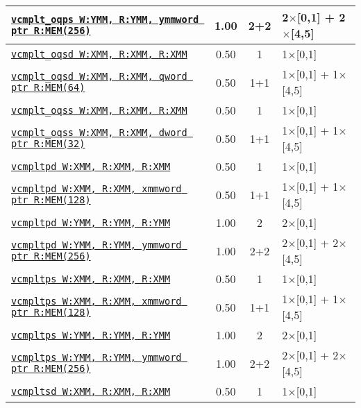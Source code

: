 \documentclass[a4paper,english,fontsize=9]{scrartcl}
\begin{document}
\begin{longtable}{p{}ccL{.25\textwidth}}
  \midrule
  \texttt{\href{https://felixcloutier.com/x86/CMPPS.html}{vcmplt\_oqps W:YMM, R:YMM, ymmword ptr R:MEM(256)}} & 1.00 & 2+2 & 2\(\times\)[0,1] + 2\(\times\)[4,5] \\
  \midrule
  \texttt{\href{https://felixcloutier.com/x86/CMPSD.html}{vcmplt\_oqsd W:XMM, R:XMM, R:XMM}} & 0.50 & 1 & 1\(\times\)[0,1] \\
  \midrule
  \texttt{\href{https://felixcloutier.com/x86/CMPSD.html}{vcmplt\_oqsd W:XMM, R:XMM, qword ptr R:MEM(64)}} & 0.50 & 1+1 & 1\(\times\)[0,1] + 1\(\times\)[4,5] \\
  \midrule
  \texttt{\href{https://felixcloutier.com/x86/CMPSS.html}{vcmplt\_oqss W:XMM, R:XMM, R:XMM}} & 0.50 & 1 & 1\(\times\)[0,1] \\
  \midrule
  \texttt{\href{https://felixcloutier.com/x86/CMPSS.html}{vcmplt\_oqss W:XMM, R:XMM, dword ptr R:MEM(32)}} & 0.50 & 1+1 & 1\(\times\)[0,1] + 1\(\times\)[4,5] \\
  \midrule
  \texttt{\href{https://felixcloutier.com/x86/CMPPD.html}{vcmpltpd W:XMM, R:XMM, R:XMM}} & 0.50 & 1 & 1\(\times\)[0,1] \\
  \midrule
  \texttt{\href{https://felixcloutier.com/x86/CMPPD.html}{vcmpltpd W:XMM, R:XMM, xmmword ptr R:MEM(128)}} & 0.50 & 1+1 & 1\(\times\)[0,1] + 1\(\times\)[4,5] \\
  \midrule
  \texttt{\href{https://felixcloutier.com/x86/CMPPD.html}{vcmpltpd W:YMM, R:YMM, R:YMM}} & 1.00 & 2 & 2\(\times\)[0,1] \\
  \midrule
  \texttt{\href{https://felixcloutier.com/x86/CMPPD.html}{vcmpltpd W:YMM, R:YMM, ymmword ptr R:MEM(256)}} & 1.00 & 2+2 & 2\(\times\)[0,1] + 2\(\times\)[4,5] \\
  \midrule
  \texttt{\href{https://felixcloutier.com/x86/CMPPS.html}{vcmpltps W:XMM, R:XMM, R:XMM}} & 0.50 & 1 & 1\(\times\)[0,1] \\
  \midrule
  \texttt{\href{https://felixcloutier.com/x86/CMPPS.html}{vcmpltps W:XMM, R:XMM, xmmword ptr R:MEM(128)}} & 0.50 & 1+1 & 1\(\times\)[0,1] + 1\(\times\)[4,5] \\
  \midrule
  \texttt{\href{https://felixcloutier.com/x86/CMPPS.html}{vcmpltps W:YMM, R:YMM, R:YMM}} & 1.00 & 2 & 2\(\times\)[0,1] \\
  \midrule
  \texttt{\href{https://felixcloutier.com/x86/CMPPS.html}{vcmpltps W:YMM, R:YMM, ymmword ptr R:MEM(256)}} & 1.00 & 2+2 & 2\(\times\)[0,1] + 2\(\times\)[4,5] \\
  \midrule
  \texttt{\href{https://felixcloutier.com/x86/CMPSD.html}{vcmpltsd W:XMM, R:XMM, R:XMM}} & 0.50 & 1 & 1\(\times\)[0,1] \\

\end{longtable}
\end{document}
